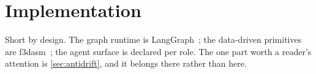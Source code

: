 \section{Implementation}
\label{sec:implementation}

Short by design. The graph runtime is LangGraph~\cite{langgraph}; the
data-driven primitives are f3dasm~\cite{f3dasm}; the agent surface is declared
per role. The one part worth a reader's attention is
\cref{sec:antidrift}, and it belongs there rather than here.
